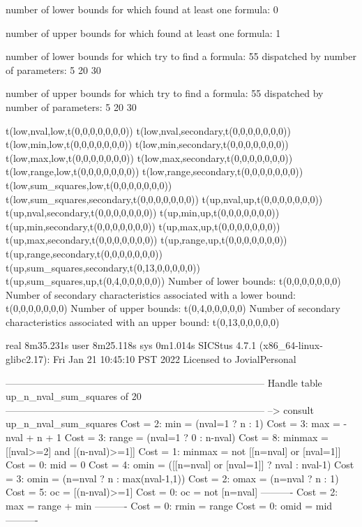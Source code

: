 number of lower bounds for which found at least one formula: 0

number of upper bounds for which found at least one formula: 1

number of lower bounds for which try to find a formula: 55
dispatched by number of parameters: 5  20  30

number of upper bounds for which try to find a formula: 55
dispatched by number of parameters: 5  20  30

t(low,nval,low,t(0,0,0,0,0,0,0))
t(low,nval,secondary,t(0,0,0,0,0,0,0))
t(low,min,low,t(0,0,0,0,0,0,0))
t(low,min,secondary,t(0,0,0,0,0,0,0))
t(low,max,low,t(0,0,0,0,0,0,0))
t(low,max,secondary,t(0,0,0,0,0,0,0))
t(low,range,low,t(0,0,0,0,0,0,0))
t(low,range,secondary,t(0,0,0,0,0,0,0))
t(low,sum_squares,low,t(0,0,0,0,0,0,0))
t(low,sum_squares,secondary,t(0,0,0,0,0,0,0))
t(up,nval,up,t(0,0,0,0,0,0,0))
t(up,nval,secondary,t(0,0,0,0,0,0,0))
t(up,min,up,t(0,0,0,0,0,0,0))
t(up,min,secondary,t(0,0,0,0,0,0,0))
t(up,max,up,t(0,0,0,0,0,0,0))
t(up,max,secondary,t(0,0,0,0,0,0,0))
t(up,range,up,t(0,0,0,0,0,0,0))
t(up,range,secondary,t(0,0,0,0,0,0,0))
t(up,sum_squares,secondary,t(0,13,0,0,0,0,0))
t(up,sum_squares,up,t(0,4,0,0,0,0,0))
Number of lower bounds:                                             t(0,0,0,0,0,0,0)
Number of secondary characteristics associated with a lower bound:  t(0,0,0,0,0,0,0)
Number of upper bounds:                                             t(0,4,0,0,0,0,0)
Number of secondary characteristics associated with an upper bound: t(0,13,0,0,0,0,0)

real	8m35.231s
user	8m25.118s
sys	0m1.014s
SICStus 4.7.1 (x86_64-linux-glibc2.17): Fri Jan 21 10:45:10 PST 2022
Licensed to JovialPersonal


--------------------------------------------------------------------------------
Handle table up_n_nval_sum_squares of 20
--------------------------------------------------------------------------------
--> consult up_n_nval_sum_squares
Cost =  2:  min    = (nval=1 ? n : 1)
Cost =  3:  max    = -nval + n + 1
Cost =  3:  range  = (nval=1 ? 0 : n-nval)
Cost =  8:  minmax = [[nval>=2] and [(n-nval)>=1]]
Cost =  1:  minmax = not [[n=nval] or [nval=1]]
Cost =  0:  mid    = 0
Cost =  4:  omin   = ([[n=nval] or [nval=1]] ? nval : nval-1)
Cost =  3:  omin   = (n=nval ? n : max(nval-1,1))
Cost =  2:  omax   = (n=nval ? n : 1)
Cost =  5:  oc     = [(n-nval)>=1]
Cost =  0:  oc     = not [n=nval]
----------
Cost =  2:  max    = range + min
----------
Cost =  0:  rmin   = range
Cost =  0:  omid   = mid
----------

